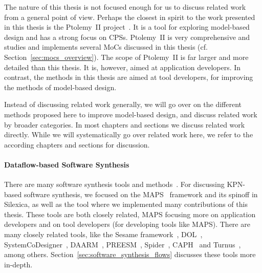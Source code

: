 The nature of this thesis is not focused enough for us to discuss related work from a general point of view.
Perhaps the closest in spirit to the work presented in this thesis is the Ptolemy~II project~\cite{Ptolemaeus:14:SystemDesign}.
It is a tool for exploring model-based design and has a strong focus on \acp{CPS}.
Ptolemy~II is very comprehensive and studies and implements several \acp{MoC} discussed in this thesis (cf. Section~\ref{sec:mocs_overview}).
The scope of Ptolemy~II is far larger and more detailed than this thesis.
It is, however, aimed at application developers.
In contrast, the methods in this thesis are aimed at tool developers, for improving the methods of model-based design.

Instead of discussing related work generally, we will go over on the different methods proposed here to improve model-based design, and discuss related work by broader categories.
In most chapters and sections we discuss related work directly.
While we will systematically go over related work here, we refer to the according chapters and sections for discussion.

\paragraph{Dataflow-based Software Synthesis}

There are many software synthesis tools and methods~\cite{lin1998softwaresynthesis,ritz1992softwaresynthesis,bhartacharyya2000softwaresynthesis,pino1995softwaresynthesis,bhattacharyya2012softwaresynthesis}.
For discussing \ac{KPN}-based software synthesis, we focused on the \ac{MAPS}~\cite{maps} framework and its spinoff in Silexica, as well as the \mocasin tool where we implemented many contributions of this thesis.
These tools are both closely related, \ac{MAPS} focusing more on application developers and \mocasin on tool developers (for developing tools like \ac{MAPS}).
There are many closely related tools, like the Sesame framework~\cite{pimentel2006systematic}, \ac{DOL}~\cite{thiele2007DOL}, SystemCoDesigner~\cite{haubelt2008systemcodesigner}, DAARM~\cite{weichslgartner2014daarm}, PREESM~\cite{pelcat2014preesm}, Spider~\cite{heulot2014spider}, CAPH~\cite{serot2013caph} and Turnus~\cite{casale2013turnus}, among others.
Section~\ref{sec:software_synthesis_flows} discusses these tools more in-depth.



